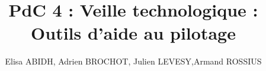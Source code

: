 \documentclass[a4paper]{article}
\begin{document}
\title{PdC 4 : Veille technologique : Outils d'aide au pilotage}
\author{Elisa ABIDH, Adrien BROCHOT, Julien LEVESY,Armand ROSSIUS}

\maketitle


\newpage
\tableofcontents
\newpage





\end{document}
